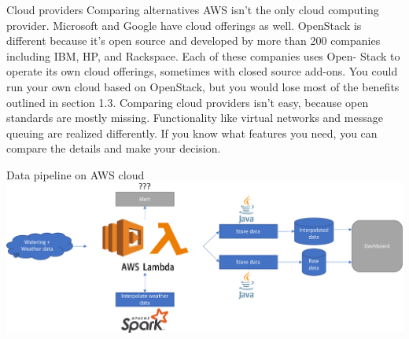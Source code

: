 \begin{frame}{Cloud providers}
    Comparing alternatives
AWS isn’t the only cloud computing provider. Microsoft and Google have cloud offerings
as well.
OpenStack is different because it’s open source and developed by more than 200
companies including IBM, HP, and Rackspace. Each of these companies uses Open-
Stack to operate its own cloud offerings, sometimes with closed source add-ons. You
could run your own cloud based on OpenStack, but you would lose most of the benefits
outlined in section 1.3.
Comparing cloud providers isn’t easy, because open standards are mostly missing.
Functionality like virtual networks and message queuing are realized differently. If you
know what features you need, you can compare the details and make your decision.
\end{frame}

\begin{frame}{Data pipeline on AWS cloud}
\includegraphics[width=\linewidth]{imgs/pipeline_aws.pdf}
\end{frame}

